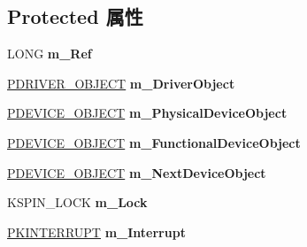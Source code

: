 \subsection*{Protected 属性}
\begin{DoxyCompactItemize}
\item 
\mbox{\label{class_c_u_s_b_hardware_device_ac007a4f6a9d50f64f551a4aa4506bb85}} 
L\+O\+NG {\bfseries m\+\_\+\+Ref}
\item 
\mbox{\label{class_c_u_s_b_hardware_device_af648cfcddf2d9e6d06400d100c620a9a}} 
\hyperlink{struct___d_r_i_v_e_r___o_b_j_e_c_t}{P\+D\+R\+I\+V\+E\+R\+\_\+\+O\+B\+J\+E\+CT} {\bfseries m\+\_\+\+Driver\+Object}
\item 
\mbox{\label{class_c_u_s_b_hardware_device_a29922b97108b76e7367f578a34cc13d5}} 
\hyperlink{struct___d_e_v_i_c_e___o_b_j_e_c_t}{P\+D\+E\+V\+I\+C\+E\+\_\+\+O\+B\+J\+E\+CT} {\bfseries m\+\_\+\+Physical\+Device\+Object}
\item 
\mbox{\label{class_c_u_s_b_hardware_device_ad21f9f2134522c52ec5f13669b089128}} 
\hyperlink{struct___d_e_v_i_c_e___o_b_j_e_c_t}{P\+D\+E\+V\+I\+C\+E\+\_\+\+O\+B\+J\+E\+CT} {\bfseries m\+\_\+\+Functional\+Device\+Object}
\item 
\mbox{\label{class_c_u_s_b_hardware_device_a11c6f5ff69a3f5a3beca8862f7b41f44}} 
\hyperlink{struct___d_e_v_i_c_e___o_b_j_e_c_t}{P\+D\+E\+V\+I\+C\+E\+\_\+\+O\+B\+J\+E\+CT} {\bfseries m\+\_\+\+Next\+Device\+Object}
\item 
\mbox{\label{class_c_u_s_b_hardware_device_a11f031e33a8b893c8c408f11f4238ca9}} 
K\+S\+P\+I\+N\+\_\+\+L\+O\+CK {\bfseries m\+\_\+\+Lock}
\item 
\mbox{\label{class_c_u_s_b_hardware_device_afe18c72ee5c9253fdf1a073dab22ccea}} 
\hyperlink{struct___k_i_n_t_e_r_r_u_p_t}{P\+K\+I\+N\+T\+E\+R\+R\+U\+PT} {\bfseries m\+\_\+\+Interrupt}
\item 
\mbox{\label{class_c_u_s_b_hardware_device_aa8998904ab07e322526d69bdf3dabe6f}} 

\end{DoxyCompactItemize}
